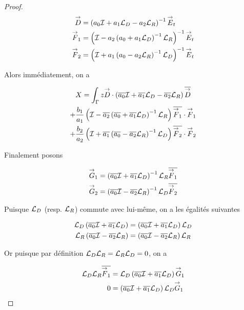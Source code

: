 \begin{proof}
    \newcommand{\vD}{\vect{D}}
    \newcommand{\vF}{\vect{F}}

    \begin{align}
      \vD & = \left(a_0 \oI + a_1 \LD - a_2\LR \right)^{-1} \vE_t
      \\
      \vF_1 & = \left(\oI - a_2 \left( a_0 + a_1\LD\right)^{-1}\LR\right)^{-1} \vE_t
      \\
      \vF_2 & = \left(\oI + a_1 \left( a_0 - a_2\LR\right)^{-1}\LD\right)^{-1} \vE_t
    \end{align}

    Alors immédiatement, on a

    \begin{multline}
      X = \int_\Gamma z \vD \cdot \left(\conj{a_0} \oI + \conj{a_1} \LD - \conj{a_2}\LR\right)\conj{\vD}
      \\
      + \frac{b_1}{a_1} \left(\oI - \conj{a_2} \left( \conj{a_0} + \conj{a_1}\LD\right)^{-1}\LR\right)\conj{\vF_1}\cdot\vF_1
      \\
      + \frac{b_2}{a_2} \left(\oI + \conj{a_1} \left( \conj{a_0} - \conj{a_2}\LR\right)^{-1}\LD\right)\conj{\vF_2}\cdot\vF_2
    \end{multline}

    Finalement posons

    \newcommand{\vG}{\vect{G}}

    \begin{align}
      \vG_1 & = \left(\conj{a_0} \oI + \conj{a_1} \LD \right)^{-1}\LR \conj{\vF_1}
      \\
      \vG_2 & = \left(\conj{a_0} \oI - \conj{a_2} \LR \right)^{-1}\LD \conj{\vF_2}
    \end{align}

    Puisque \({\mathcal{L}_D}\) (resp. \({\mathcal{L}_R}\)) commute avec lui-même, on a les égalités suivantes

    \begin{align}
      {\mathcal{L}_D}\left({\overline{a_0}} {\mathcal{I}} + {\overline{a_1}} {\mathcal{L}_D} \right)&=\left({\overline{a_0}} {\mathcal{I}} + {\overline{a_1}} {\mathcal{L}_D} \right){\mathcal{L}_D}
      \\
      {\mathcal{L}_R}\left({\overline{a_0}} {\mathcal{I}} - {\overline{a_2}} {\mathcal{L}_R} \right)&=\left({\overline{a_0}} {\mathcal{I}} - {\overline{a_2}} {\mathcal{L}_R} \right){\mathcal{L}_R}
    \end{align}

    Or puisque par définition \({\mathcal{L}_D}{\mathcal{L}_R}={\mathcal{L}_R}{\mathcal{L}_D}=0\), on a

    \begin{align}
      \LD\LR\conj{\vF_1} &= \LD\left(\conj{a_0} \oI + \conj{a_1} \LD \right)\vG_1
      \\
      0 & =\left(\conj{a_0} \oI + \conj{a_1} \LD \right)\LD\vG_1
    \end{align}


\end{proof}
